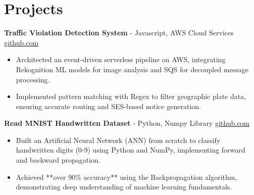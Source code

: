 \documentclass[11pt]{article}       %
\begin{document}
\vspace{-18.5pt}

\section*{Projects}

\textbf{Traffic Violation Detection System}{ - Javascript, AWS Cloud Services} \hfill \href{https://github.com/Monica20030707/AWS_rekonigition-N-read-database}{github.com} \\
\vspace{-9pt}
\begin{itemize}
  \item Architected an event-driven serverless pipeline on AWS, integrating Rekognition ML models for image analysis and SQS for decoupled message processing.
  \item Implemented pattern matching with Regex to filter geographic plate data, ensuring accurate routing and SES-based notice generation.
\end{itemize}

\textbf{Read MNIST Handwritten Dataset}{ - Python, Numpy Library} \hfill \href{https://github.com/Monica20030707/Artificial-Neutral-Network_ML}{github.com} \\
\vspace{-9pt}
\begin{itemize} 
  \item Built an Artificial Neural Network (ANN) from scratch to classify handwritten digits (0-9) using Python and NumPy, implementing forward and backward propagation.
  \item Achieved **over 90\% accuracy** using the Backpropagation algorithm, demonstrating deep understanding of machine learning fundamentals.
\end{itemize}

\end{document}

